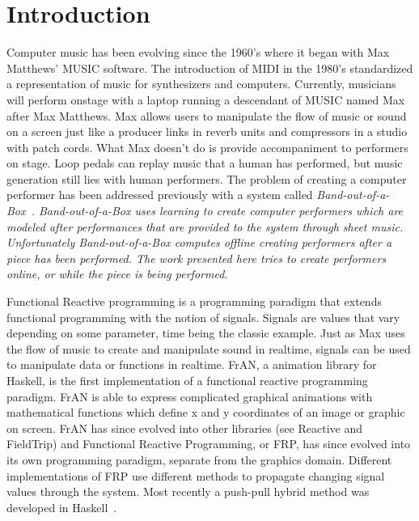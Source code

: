 \documentclass[12pt]{ucthesis}
\begin{document}
\pagestyle{plain}

\renewcommand{\baselinestretch}{1.66}


\chapter{Introduction}
\label{intro}

Computer music has been evolving since the 1960's where it began with Max Matthews' MUSIC software. The introduction of MIDI in the 1980's standardized a representation of music for synthesizers and computers. Currently, musicians will perform onstage with a laptop running a descendant of MUSIC named Max after Max Matthews. Max allows users to manipulate the flow of music or sound on a screen just like a producer links in reverb units and compressors in a studio with patch cords. What Max doesn't do is provide accompaniment to performers on stage. Loop pedals can replay music that a human has performed, but music generation still lies with human performers. The problem of creating a computer performer has been addressed previously with a system called \em{Band-out-of-a-Box}\em~\cite{bob}. \em{Band-out-of-a-Box }\em uses learning to create computer performers which are modeled after performances that are provided to the system through sheet music. Unfortunately \em{Band-out-of-a-Box }\em computes offline creating performers after a piece has been performed. The work presented here tries to create performers online, or while the piece is being performed.

Functional Reactive programming is a programming paradigm that extends functional programming with the notion of signals. Signals are values that vary depending on some parameter, time being the classic example. Just as Max uses the flow of music to create and manipulate sound in realtime, signals can be used to manipulate data or functions in realtime. FrAN, a animation library for Haskell, is the first implementation of a functional reactive programming paradigm. FrAN is able to express complicated graphical animations with mathematical functions which define x and y coordinates of an image or graphic on screen. FrAN has since evolved into other libraries (see Reactive and FieldTrip) and Functional Reactive Programming, or FRP, has since evolved into its own programming paradigm, separate from the graphics domain. Different implementations of FRP use different methods to propagate changing signal values through the system. Most recently a push-pull hybrid method was developed in Haskell~\cite{push-pull-frp}. 
\end{document}
